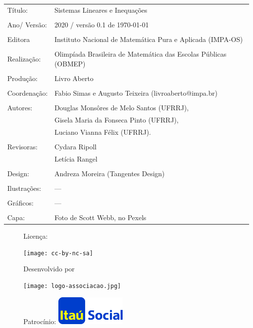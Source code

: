 \begin{tabular}{p{}p{}}
Título: & Sistemas Lineares e Inequações\\
\\
Ano/ Versão: & 2020 / versão 0.1 de \today\\
\\
Editora & Instituto Nacional de Matem\'atica Pura e Aplicada (IMPA-OS)\\
\\
Realização:& Olimp\'iada Brasileira de Matem\'atica das Escolas P\'ublicas (OBMEP)\\
\\
Produção:& Livro Aberto\\
\\
Coordenação:& Fabio Simas e Augusto Teixeira (livroaberto@impa.br)\\
\\
  Autores: & Douglas Monsôres de Melo Santos (UFRRJ),\\
        & Gisela Maria da Fonseca Pinto (UFRRJ),\\
             & Luciano Vianna Félix (UFRRJ).\\
\\
Revisoras: &  Cydara Ripoll  \\
                &  Letícia Rangel \\
\\
Design: & Andreza Moreira (Tangentes Design) \\
\\
  Ilustrações: & --- \\ 
\\
Gráficos: & --- \\
\\
  Capa: & Foto de Scott Webb, no Pexels \\

\end{tabular}

\begin{figure}[b]
\begin{minipage}[l]{5cm}
\centering

{\large Licença:}

  \texttt{[image: cc-by-nc-sa]}
\end{minipage}\hfill
\begin{minipage}[c]{5cm}
\centering
{\large Desenvolvido por}

\texttt{[image: logo-associacao.jpg]}
\end{minipage}
\begin{minipage}[r]{5cm}
\centering

{\large Patrocínio:}
  \vspace{1em}
  \includegraphics[width=3.5cm]{itau}
\end{minipage}
\end{figure}

